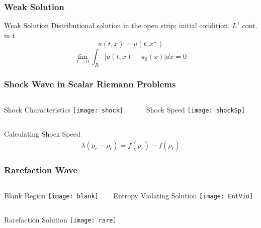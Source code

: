 \documentclass{beamer}
\begin{document}
\begin{frame}
\frametitle{Weak Solution}
\begin{block}{Weak Solution}
Distributional solution in the open strip; initial condition, $L^1$ cont. in t
$$
u(t,x) = u(t,x^+)
$$
$$
\mathop {\lim }\limits_{t \to 0} \int_R \left|u(t,x)-u_0(x)\right|dx = 0
$$
\end{block}
\end{frame}
\begin{frame}
\frametitle{Shock Wave in Scalar Riemann Problems}
\scriptsize{
\begin{columns}
\begin{column}[c]{5cm}
\begin{beamerboxesrounded}[upper=uppercol,lower=lowercol,shadow=true,width=4cm]{Shock Characteristics}
\texttt{[image: shock]}
\end{beamerboxesrounded}
\end{column}
\begin{column}[c]{5cm}
\begin{beamerboxesrounded}[upper=uppercol,lower=lowercol,shadow=true,width=4cm]{Shock Speed}
\texttt{[image: shockSp]}
\end{beamerboxesrounded}
\end{column}
\end{columns}
\begin{exampleblock}{Calculating Shock Speed}
\begin{eqnarray*}
\lambda (\rho_r - \rho_{\ell}) = f(\rho_r) - f(\rho_{\ell})
\end{eqnarray*}
\end{exampleblock}
}
\end{frame}
\begin{frame}
\frametitle{Rarefaction Wave}
\scriptsize{
\begin{columns}
\begin{column}[c]{6cm}
\begin{beamerboxesrounded}[upper=uppercol,lower=lowercol,shadow=true,width=6cm]{Blank Region}
\texttt{[image: blank]}
\end{beamerboxesrounded}
\end{column}
\begin{column}[c]{5cm}
\begin{beamerboxesrounded}[upper=uppercol,lower=lowercol,shadow=true,width=4cm]{Entropy Violating Solution}
\texttt{[image: EntVio]}
\end{beamerboxesrounded}
\end{column}
\end{columns}
\begin{beamerboxesrounded}[upper=uppercol,lower=lowercol,shadow=true,width=10cm]{Rarefaction Solution}
\texttt{[image: rare]}
\end{beamerboxesrounded}}
\end{frame}
\end{document}
